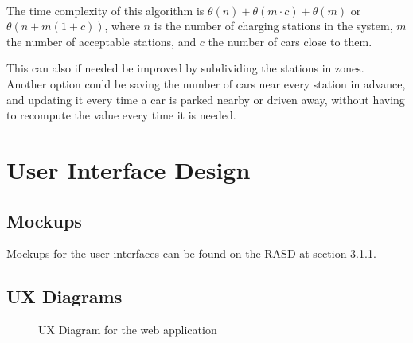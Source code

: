 \documentclass[english]{article}
\begin{document}
\paragraph{}
The time complexity of this algorithm is $\theta(n) + \theta(m \cdot c) + \theta(m)$ or $\theta(n + m (1+c))$, where $n$ is the number of charging stations in the system, $m$ the number of acceptable stations, and $c$ the number of cars close to them.

This can also if needed be improved by subdividing the stations in zones.
Another option could be saving the number of cars near every station in advance, and updating it every time a car is parked nearby or driven away, without having to recompute the value every time it is needed.

\newpage

\section{User Interface Design}
\label{sec:userinterface}

\subsection{Mockups}

Mockups for the user interfaces can be found on the \href{https://github.com/PietroFerretti/PowerEnJoy/blob/master/releases/RASD.pdf}{RASD} at section 3.1.1.

\subsection{UX Diagrams}
\label{subsec:uxdiagram}

\begin{figure}[H]
	\centering
	\caption{UX Diagram for the web application}
\end{figure}
\end{document}
